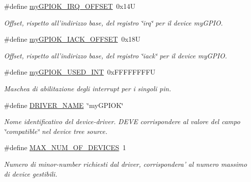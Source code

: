 \begin{DoxyCompactItemize}
\#define \hyperlink{group___linux-_driver_ga37ee502d1ba364dfde9261c4f7a537a6}{my\+G\+P\+I\+O\+K\+\_\+\+I\+R\+Q\+\_\+\+O\+F\+F\+S\+E\+T}~0x14\+U
\begin{DoxyCompactList}\small\item\em Offset, rispetto all'indirizzo base, del registro \char`\"{}irq\char`\"{} per il device my\+G\+P\+I\+O. \end{DoxyCompactList}\item 
\#define \hyperlink{group___linux-_driver_gac72408c288009c213c0231973b3fe761}{my\+G\+P\+I\+O\+K\+\_\+\+I\+A\+C\+K\+\_\+\+O\+F\+F\+S\+E\+T}~0x18\+U
\begin{DoxyCompactList}\small\item\em Offset, rispetto all'indirizzo base, del registro \char`\"{}iack\char`\"{} per il device my\+G\+P\+I\+O. \end{DoxyCompactList}\item 
\#define \hyperlink{group___linux-_driver_ga78d3a23bb3381a43eaba8bbf8b1cc750}{my\+G\+P\+I\+O\+K\+\_\+\+U\+S\+E\+D\+\_\+\+I\+N\+T}~0x\+F\+F\+F\+F\+F\+F\+F\+F\+U
\begin{DoxyCompactList}\small\item\em Maschea di abilitazione degli interrupt per i singoli pin. \end{DoxyCompactList}\item 
\#define \hyperlink{group___linux-_driver_ga25634d21648ca7fb7a2aca614bafaaeb}{D\+R\+I\+V\+E\+R\+\_\+\+N\+A\+M\+E}~\char`\"{}my\+G\+P\+I\+O\+K\char`\"{}
\begin{DoxyCompactList}\small\item\em Nome identificativo del device-\/driver. D\+E\+V\+E corrispondere al valore del campo \char`\"{}compatible\char`\"{} nel device tree source. \end{DoxyCompactList}\item 
\#define \hyperlink{group___linux-_driver_gad32bf20eb64878cb958ca6ac9c96c21d}{M\+A\+X\+\_\+\+N\+U\+M\+\_\+\+O\+F\+\_\+\+D\+E\+V\+I\+C\+E\+S}~1
\begin{DoxyCompactList}\small\item\em Numero di minor-\/number richiesti dal driver, corrispondera' al numero massimo di device gestibili. \end{DoxyCompactList}\end{DoxyCompactItemize}
